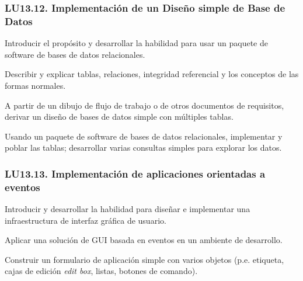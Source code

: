 \subsubsection{LU13.12. Implementación de un Diseño simple de Base de Datos}\label{sec:LU13.12}
\begin{LearningUnit}
\begin{LUGoal}
\item Introducir el propósito y desarrollar la habilidad para usar un paquete de software de bases de datos relacionales.
\end{LUGoal}

\begin{LUObjective}
\item Describir y explicar tablas, relaciones, integridad referencial y los conceptos de las formas normales.
\item A partir de un dibujo de flujo de trabajo o de otros documentos de requisitos, derivar un diseño de bases de datos simple con múltiples tablas.
\item Usando un paquete de software de bases de datos relacionales, implementar y poblar las tablas; desarrollar varias consultas simples para explorar los datos.
\end{LUObjective}
\end{LearningUnit}

\subsubsection{LU13.13. Implementación de aplicaciones orientadas a eventos}\label{sec:LU13.13}
\begin{LearningUnit}
\begin{LUGoal}
\item Introducir y desarrollar la habilidad para diseñar e implementar una infraestructura de interfaz gráfica de usuario.
\end{LUGoal}

\begin{LUObjective}
\item Aplicar una solución de GUI basada en eventos en un ambiente de desarrollo.
\item Construir un formulario de aplicación simple con varios objetos (p.e. etiqueta, cajas de edición {\it edit box}, listas, botones de comando).
\end{LUObjective}
\end{LearningUnit}

